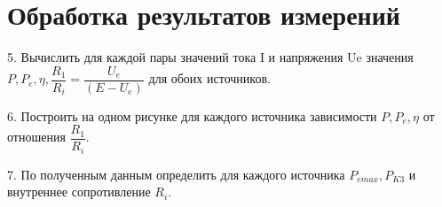 \section*{Обработка результатов измерений}

5. Вычислить для каждой пары значений тока I и напряжения Ue
значения $ P, P_e, \eta, \dfrac{R_1}{R_i} = \dfrac{U_e}{(E - U_e)} $ для обоих источников.

6. Построить на одном рисунке для каждого источника зависимости 
$ P, P_e, \eta $ от отношения $ \dfrac{R_1}{R_i} $.

7. По полученным данным определить для каждого источника 
$ P_{e max}, P_{K3} $ и внутреннее сопротивление $ R_i $. 
